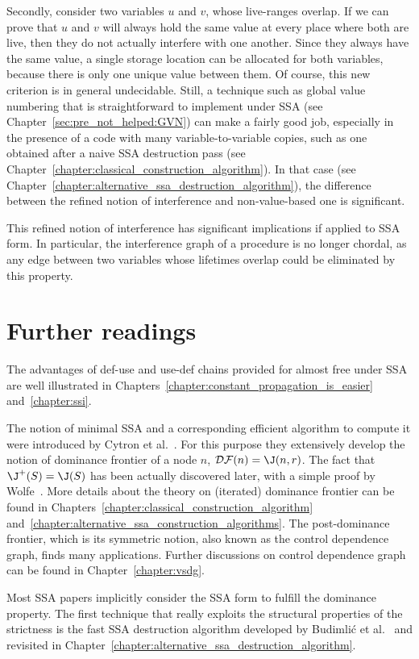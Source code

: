 Secondly, consider two variables $u$ and $v$, whose live-ranges overlap. 
If we can prove that $u$ and $v$ will always hold the same value at every place where both are live, then they do not actually interfere with one another. 
Since they always have the same value, a single storage location can be allocated for both variables, because there is only one unique value between them. 
Of course, this new criterion is in general undecidable. 
Still, a technique such as global value numbering that is straightforward to implement under SSA (see Chapter~\ref{sec:pre_not_helped:GVN}) can make a fairly good job, especially in the presence of a code with many variable-to-variable copies, such as one obtained after a naive SSA destruction pass (see Chapter~\ref{chapter:classical_construction_algorithm}). 
In that case (see Chapter~\ref{chapter:alternative_ssa_destruction_algorithm}), the difference between the refined notion of interference and non-value-based one is significant.

This refined notion of interference has significant implications if applied to SSA form. 
In particular, the interference graph of a procedure is no longer chordal, as any edge between two variables whose lifetimes overlap could be eliminated by this property.


\section{Further readings}
The advantages of def-use and use-def chains provided for almost free under SSA are well illustrated in Chapters~\ref{chapter:constant_propagation_is_easier} and~\ref{chapter:ssi}.

The notion of minimal SSA and a corresponding efficient algorithm to compute it were introduced by Cytron et al.~\cite{CytronOct91}. 
For this purpose they extensively develop the notion of dominance frontier of a node $n$, ${\cal DF}(n)=\J(n,r)$. 
The fact that $\J^+(S)=\J(S)$ has been actually discovered later, with a simple proof by Wolfe~\cite{WolfeJul94}. 
More details about the theory on (iterated) dominance frontier can be found in Chapters~\ref{chapter:classical_construction_algorithm} and~\ref{chapter:alternative_ssa_construction_algorithms}. 
The post-dominance frontier, which is its symmetric notion, also known as the control dependence graph, finds many applications. 
Further discussions on control dependence graph can be found in Chapter~\ref{chapter:vsdg}.

Most SSA papers implicitly consider the SSA form to fulfill the dominance property. 
The first technique that really exploits the structural properties of the strictness is the fast SSA destruction algorithm developed by Budimli\'c et al.~\cite{BudimlicJun02} and revisited in Chapter~\ref{chapter:alternative_ssa_destruction_algorithm}.

